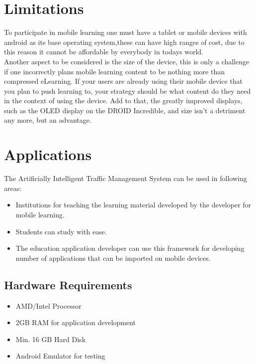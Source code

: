 \documentclass[openany,12pt]{report}
\begin{document}
\section{Limitations}
\hspace*{0.5in}To participate in mobile learning one must have a tablet or mobile devices with android as its base operating system,these can have high ranges of cost, due to this reason it cannot be affordable by everybody in todays world.
\\
\hspace*{0.5in}Another aspect to be considered is the size of the device, this is only a challenge if one incorrectly plans mobile learning content to be nothing more than compressed eLearning. If your users are already using their mobile device that you plan to push learning to, your strategy should be what content do they need in the context of using the device. Add to that, the greatly improved displays, such as the OLED display on the DROID Incredible, and size isn't a detriment any more, but an advantage.

\section{Applications}
\hspace*{0.5in}The Artificially Intelligent Traffic Management System can be used in following areas:
\begin{itemize}
\item{Institutions for teaching the learning material developed by the developer for mobile learning.}
\item{Students can study with ease.}
\item{The education application developer can use this framework for developing number of applications that can be imported on mobile devices.}
\end{itemize}

\subsection{Hardware Requirements}
\begin{itemize}
\item{AMD/Intel Processor}
\item{2GB RAM for application development}
\item{Min. 16 GB Hard Disk}
\\
\item{Android Emulator for testing}
\end{itemize}
\end{document}
